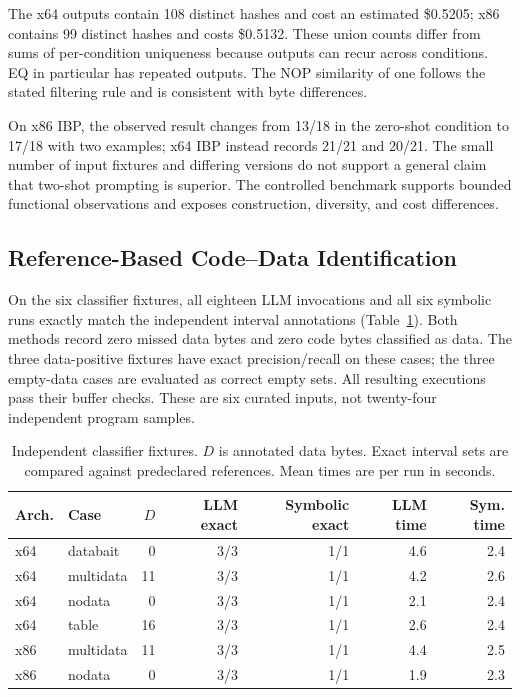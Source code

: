 The x64 outputs contain 108 distinct hashes and cost an estimated
\$0.5205; x86 contains 99 distinct hashes and costs \$0.5132.
These union counts differ from sums of per-condition uniqueness
because outputs can recur across conditions. EQ in particular has
repeated outputs. The NOP similarity of one follows the stated
filtering rule and is consistent with byte differences.

On x86 IBP, the observed result changes from 13/18 in the zero-shot
condition to 17/18 with two examples; x64 IBP instead records 21/21
and 20/21. The small number of input fixtures and differing versions
do not support a general claim that two-shot prompting is superior.
The controlled benchmark supports bounded functional observations
and exposes construction, diversity, and cost differences.

\subsection{Reference-Based Code--Data Identification}
On the six classifier fixtures, all eighteen LLM invocations and all
six symbolic runs exactly match the independent interval annotations
(Table~\ref{tab:new_classifier}). Both methods record zero missed
data bytes and zero code bytes classified as data. The three
data-positive fixtures have exact precision/recall on these cases;
the three empty-data cases are evaluated as correct empty sets.
All resulting executions pass their buffer checks. These are six
curated inputs, not twenty-four independent program samples.

\begin{table}[t]
\caption{Independent classifier fixtures. $D$ is annotated data bytes.
Exact interval sets are compared against predeclared references.
Mean times are per run in seconds.}
\label{tab:new_classifier}
\centering\small\setlength{\tabcolsep}{4pt}
\begin{tabular}{@{}llrrrrr@{}}
\toprule
Arch. & Case & $D$ & LLM exact & Symbolic exact & LLM time & Sym. time \\
\midrule
x64 & databait & 0 & 3/3 & 1/1 & 4.6 & 2.4 \\
x64 & multidata & 11 & 3/3 & 1/1 & 4.2 & 2.6 \\
x64 & nodata & 0 & 3/3 & 1/1 & 2.1 & 2.4 \\
x64 & table & 16 & 3/3 & 1/1 & 2.6 & 2.4 \\
x86 & multidata & 11 & 3/3 & 1/1 & 4.4 & 2.5 \\
x86 & nodata & 0 & 3/3 & 1/1 & 1.9 & 2.3 \\
\bottomrule
\end{tabular}
\end{table}


